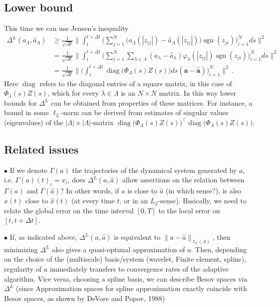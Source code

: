 \documentclass[A4paper,11pt]{article}
\theoremstyle{definition}
\DeclareMathOperator{\sgn}{sgn}
\DeclareMathOperator{\diag}{diag}
\begin{document}
\subsection{Lower bound}

This time we can use Jensen's inequality
\begin{align*}
	\Delta^L(a_\Lambda,\widehat a_\Lambda)
		&\geq\frac{1}{\sqrt{\Delta t}}\Biggl\|\int_t^{t+\Delta t}\biggl(\sum_{j=1}^N
			\bigl(a_\Lambda(|z_{ij}|)-\widehat a_\Lambda(|z_{ij}|)\bigr)\sgn(z_{ji})\biggr)_{i=1}^N ds\Biggr\|^2\\
		&=\frac{1}{\sqrt{\Delta t}}\Biggl\|\int_t^{t+\Delta t}\biggl(\sum_{j=1}^N\sum_{\lambda\in\Lambda}
			(a_\lambda-\widehat a_\lambda)\varphi_\lambda(|z_{ij}|)\sgn(z_{ji})\biggr)_{i=1}^N ds\Biggr\|^2\\
		&=\frac{1}{\sqrt{\Delta t}}\Biggl\|\biggl(\int_t^{t+\Delta t}\diag\bigl(\Phi_\Lambda(s)Z(s)\bigr)ds
			(\mathbf{a}-\mathbf{\widehat a})\biggr)_{i=1}^N\Biggr\|^2\,.
\end{align*}
Here $\diag$ refers to the diagonal entries of a square matrix, in this case of $\Phi_\lambda(s)Z(s)$, which for every $\lambda\in\Lambda$ is an $N\times N$ matrix. In this way lower bounds for $\Delta^L$ can be obtained from properties of these matrices. For instance, a bound in some $\ell_2$-norm can be derived from estimates of singular values (eigenvalues) of the $|\Lambda|\times|\Lambda|$-matrix
$\diag\bigl(\Phi_\Lambda(s)Z(s)\bigr)^\top\diag\bigl(\Phi_\Lambda(s)Z(s)\bigr)$.


\subsection{Related issues}

$\bullet$ If we denote $\Gamma(a)$ the trajectories of the dynamical system generated by $a$, i.e. $\Gamma(a)(t)_i=x_i$, does $\Delta^L(a,\widehat a)$ allow assertions on the relation between $\Gamma(a)$ and $\Gamma(\widehat a)$? In other words, if $a$ is close to $\widehat a$ (in which sense?), is also $x(t)$ close to $\widehat x(t)$ (at every time $t$, or in an $L_2$-sense). Basically, we need to relate the global error on the time interval $[0,T]$ to the local error on $[t,t+\Delta t]$.

$\bullet$ If, as indicated above, $\Delta^L(a,\widehat a)$ is equivalent to $\|a-\widehat a\|_{\ell_2(\Lambda)}$, then minimizing $\Delta^L$ also gives a quasi-optimal approximation of $a$. Then, depending on the choice of the (multiscale) basis/system (wavelet, Finite element, spline), regularity of $a$ immediately transfers to convergence rates of the adaptive algorithm. Vice versa, choosing a spline basis, we can describe Besov spaces via $\Delta^L$ (since Approximation spaces for spline approximation exactly coincide with Besov spaces, as shown by DeVore and Popov, 1988)
\end{document}
